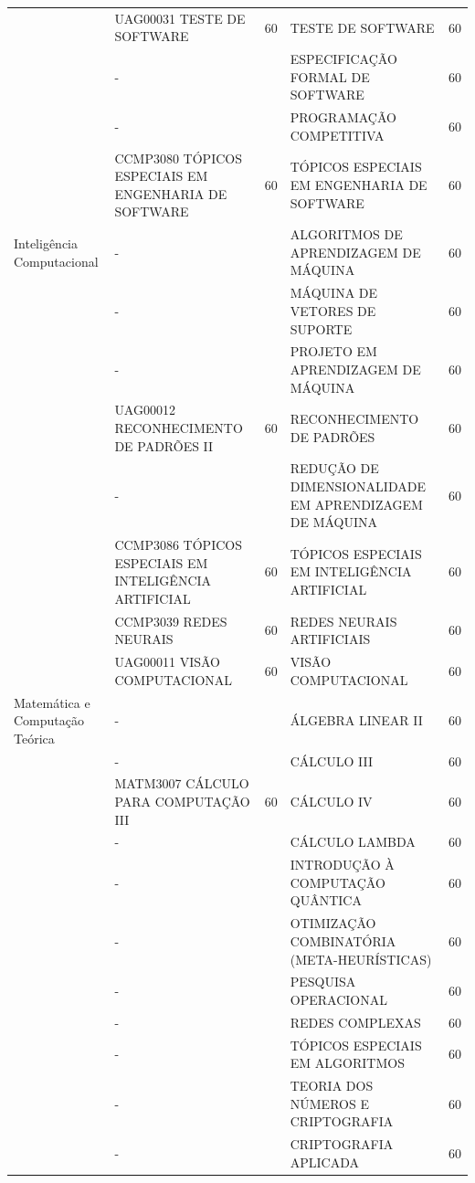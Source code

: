 \documentclass[
	12pt,				%
	openright,			%
  oneside,     %
	a4paper,			%
 hyphens,
	chapter=TITLE,		%
	english,			%
	french,				%
	spanish,			%
	brazil				%
	]{abntex2}
\begin{document}
\begin{center}
\begin{tiny}
\begin{longtable}{p{2cm}p{5.4cm}cp{5.4cm}c}
      & UAG00031 TESTE DE SOFTWARE & 60 & TESTE DE SOFTWARE & 60 \\ \cline{2-5}
      & - & & ESPECIFICAÇÃO FORMAL DE SOFTWARE & 60 \\ \cline{2-5}
      & - & & PROGRAMAÇÃO COMPETITIVA & 60 \\ \cline{2-5}
      & CCMP3080 TÓPICOS ESPECIAIS EM ENGENHARIA DE SOFTWARE & 60 & TÓPICOS ESPECIAIS EM ENGENHARIA DE SOFTWARE & 60 \\ \midrule
    Inteligência Computacional & - & & ALGORITMOS DE APRENDIZAGEM DE MÁQUINA & 60 \\ \cline{2-5}
      & - & & MÁQUINA DE VETORES DE SUPORTE & 60 \\ \cline{2-5}
      & - & & PROJETO EM APRENDIZAGEM DE MÁQUINA & 60 \\ \cline{2-5}
      & UAG00012 RECONHECIMENTO DE PADRÕES II & 60 & RECONHECIMENTO DE PADRÕES & 60 \\ \cline{2-5}
      & - & & REDUÇÃO DE DIMENSIONALIDADE EM APRENDIZAGEM DE MÁQUINA & 60 \\ \cline{2-5}
      & CCMP3086 TÓPICOS ESPECIAIS EM INTELIGÊNCIA ARTIFICIAL & 60 & TÓPICOS ESPECIAIS EM INTELIGÊNCIA ARTIFICIAL & 60 \\ \cline{2-5}
      & CCMP3039 REDES NEURAIS & 60 & REDES NEURAIS ARTIFICIAIS & 60 \\ \cline{2-5}
      & UAG00011 VISÃO COMPUTACIONAL & 60 & VISÃO COMPUTACIONAL & 60 \\ \midrule
    Matemática e Computação Teórica & - & & ÁLGEBRA LINEAR II & 60 \\ \cline{2-5}
      & - & & CÁLCULO III & 60 \\ \cline{2-5}
      & MATM3007 CÁLCULO PARA COMPUTAÇÃO III & 60 & CÁLCULO IV & 60 \\ \cline{2-5}
      & - & & CÁLCULO LAMBDA & 60 \\ \cline{2-5}
      & - & & INTRODUÇÃO À COMPUTAÇÃO QUÂNTICA  & 60 \\ \cline{2-5}
      & - & & OTIMIZAÇÃO COMBINATÓRIA (META-HEURÍSTICAS) & 60 \\ \cline{2-5}
      & - & & PESQUISA OPERACIONAL & 60 \\ \cline{2-5}
      & - & & REDES COMPLEXAS & 60 \\ \cline{2-5}
      & - & & TÓPICOS ESPECIAIS EM ALGORITMOS & 60 \\ \cline{2-5}
      & - & & TEORIA DOS NÚMEROS E CRIPTOGRAFIA & 60 \\ \cline{2-5}
      & - & & CRIPTOGRAFIA APLICADA & 60 \\ \cline{2-5}

\end{longtable}
\end{tiny}
\end{center}
\end{document}
